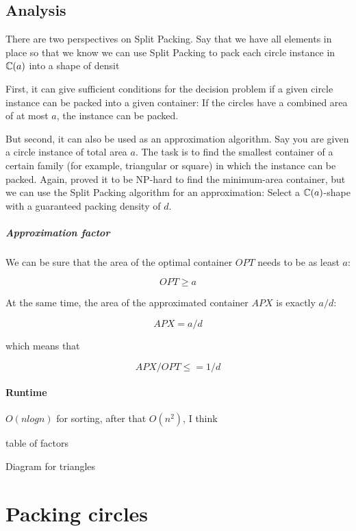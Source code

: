 \documentclass[a4paper,style=print,oneside,bibliography=totoc,nexus,lnum,extramargin]{tubsbook}
\begin{document}
\section{Analysis}

There are two perspectives on Split Packing. Say that we have all elements in place so that we know we can use Split Packing to pack each circle instance in $\mathbb{C}(a)$ into a shape of densit

First, it can give sufficient conditions for the decision problem if a given circle instance can be packed into a given container: If the circles have a combined area of at most $a$, the instance can be packed.

But second, it can also be used as an approximation algorithm. Say you are given a circle instance of total area $a$. The task is to find the smallest container of a certain family (for example, triangular or square) in which the instance can be packed. Again, \textcite{DFL2010circle} proved it to be NP-hard to find the minimum-area container, but we can use the Split Packing algorithm for an approximation: Select a $\mathbb{C}(a)$-shape with a guaranteed packing density of $d$.

\paragraph{Approximation factor}

We can be sure that the area of the optimal container $OPT$ needs to be as least $a$:

$$OPT \ge a$$

At the same time, the area of the approximated container $APX$ is exactly $a/d$:

$$APX = a/d$$

which means that

$$APX/OPT \le = 1/d$$

\subsubsection{Runtime}

$O(n log n)$ for sorting, after that $O(n^2)$, I think

table of factors

Diagram for triangles

\chapter{Packing circles}\label{ch:circles}
\end{document}

